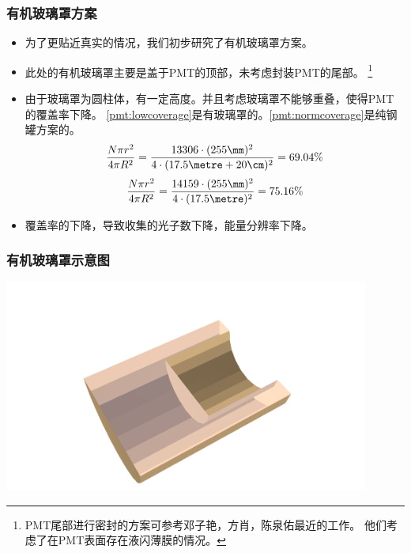 \begin{frame}
    \frametitle{有机玻璃罩方案}
    \begin{itemize}
        \item 为了更贴近真实的情况，我们初步研究了有机玻璃罩方案。
        \item 此处的有机玻璃罩主要是盖于PMT的顶部，未考虑封装PMT的尾部。
              \footnote{\footnotesize PMT尾部进行密封的方案可参考邓子艳，方肖，陈泉佑最近的工作。
                        他们考虑了在PMT表面存在液闪薄膜的情况。}
        \item 由于玻璃罩为圆柱体，有一定高度。并且考虑玻璃罩不能够重叠，使得PMT的覆盖率下降。
            \ref{pmt:lowcoverage}是有玻璃罩的。\ref{pmt:normcoverage}是纯钢罐方案的。
            \begin{equation} \label{pmt:lowcoverage}
                {N\pi{}r ^{2} \over 4\pi{}R^{2}} 
                = {13306 \cdot (255\mm)^{2} \over 4 \cdot (17.5\metre+20\cm)^{2}}
                = 69.04\%
            \end{equation}
            \begin{equation} \label{pmt:normcoverage}
                {N\pi{}r ^{2} \over 4\pi{}R^{2}} 
                = {14159 \cdot (255\mm)^{2} \over 4 \cdot (17.5\metre)^{2}}
                = 75.16\%
            \end{equation}
        \item 覆盖率的下降，导致收集的光子数下降，能量分辨率下降。
              
    \end{itemize}
\end{frame}

\begin{frame}
    \frametitle{有机玻璃罩示意图}
    \includegraphics[width=12cm,keepaspectratio]{data/PMT_HAT.png}
\end{frame}

